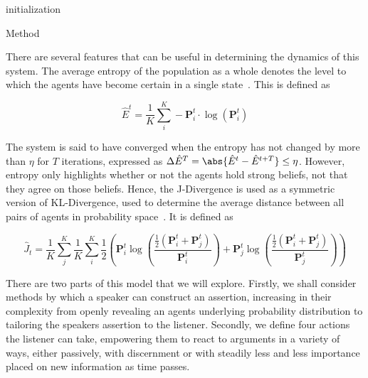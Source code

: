 \begin{algorithm}[H]
\SetAlgoLined
{}
 initialization\;
 \caption{Method}
\end{algorithm}

There are several features that can be useful in determining the dynamics of this system. The average entropy of the population as a whole denotes the level to which the agents have become certain in a single state~\cite{Shannon1948ACommunication}. This is defined as

\begin{equation}\label{eq:shannon_entropy}
    \hat{E}^t = \frac{1}{K} \sum_i^K - \mathbf{P}^t_i \cdot \log ( \mathbf{P}^t_i)
\end{equation}

The system is said to have converged when the entropy has not changed by more than $\eta $ for $T$ iterations, expressed as $\Delta \hat{E}^T = \abs{ \hat{E}^t -  \hat{E}^{t+T}}  \leq \eta$. However, entropy only highlights whether or not the agents hold strong beliefs, not that they agree on those beliefs. Hence, the J-Divergence is used as a symmetric version of KL-Divergence, used to determine the average distance between all pairs of agents in probability space~\cite{Johnson2001SymmetrizingDistance}. It is defined as

\begin{equation}
    \hat{J}_{t} = \frac{1}{K} \sum_j^K \frac{1}{K} \sum_i^K  \frac{1}{2} \left( \mathbf{P}^t_i \log \left( \frac{ \frac{1}{2} (\mathbf{P}^t_i + \mathbf{P}^t_j) }{\mathbf{P}^t_i} \right) +  \mathbf{P}^t_j \log \left( \frac{ \frac{1}{2} (\mathbf{P}^t_i + \mathbf{P}^t_j) }{\mathbf{P}^t_j} \right) \right)
\end{equation}

There are two parts of this model that we will explore. Firstly, we shall consider methods by which a speaker can construct an assertion, increasing in their complexity from openly revealing an agents underlying probability distribution to tailoring the speakers assertion to the listener. Secondly, we define four actions the listener can take, empowering them to react to arguments in a variety of ways, either passively, with discernment or with steadily less and less importance placed on new information as time passes.







